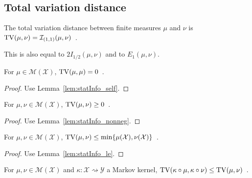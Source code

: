 


\subsection{Total variation distance}

\begin{definition}
  \label{def:TV}
  The total variation distance between finite measures $\mu$ and $\nu$ is $\operatorname{TV}(\mu, \nu) = \mathcal I_{(1,1)}(\mu, \nu)$~.
\end{definition}

This is also equal to $2 I_{1/2}(\mu, \nu)$ and to $E_1(\mu, \nu)$.

\begin{lemma}
  \label{lem:tv_self}
  For $\mu \in \mathcal M(\mathcal X)$, $\operatorname{TV}(\mu, \mu) = 0$~.
\end{lemma}

\begin{proof}%
{}
Use Lemma~\ref{lem:statInfo_self}.
\end{proof}

\begin{lemma}
  \label{lem:tv_nonneg}
  For $\mu, \nu \in \mathcal M(\mathcal X)$, $\operatorname{TV}(\mu, \nu) \ge 0$~.
\end{lemma}

\begin{proof}%
{}
Use Lemma~\ref{lem:statInfo_nonneg}.
\end{proof}


\begin{lemma}
  \label{lem:tv_le}
  For $\mu, \nu \in \mathcal M(\mathcal X)$, $\operatorname{TV}(\mu, \nu) \le \min\{\mu(\mathcal X), \nu(\mathcal X)\}$~.
\end{lemma}

\begin{proof}%
{}
Use Lemma~\ref{lem:statInfo_le}.
\end{proof}


\begin{theorem}
  \label{thm:tv_data_proc}
  For $\mu, \nu \in \mathcal M(\mathcal X)$ and $\kappa : \mathcal X \rightsquigarrow \mathcal Y$ a Markov kernel, $\operatorname{TV}(\kappa \circ \mu, \kappa \circ \nu) \le \operatorname{TV}(\mu, \nu)$~.
\end{theorem}


